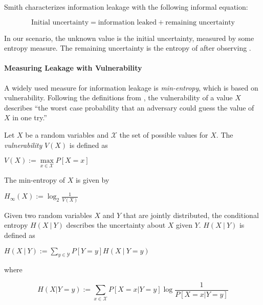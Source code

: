 Smith \cite{smith09} characterizes information leakage with the following informal equation:
\begin{center}
    \begin{equation}
        \text{Initial uncertainty} = \text{information leaked} + \text{remaining uncertainty}
    \end{equation}\label{eq:measure}
\end{center}
In our scenario, the unknown value \In is the initial uncertainty, measured by some entropy measure. The remaining uncertainty is the entropy of \In after observing \Out.

\paragraph*{Measuring Leakage with Vulnerability}
A widely used measure for information leakage is \emph{min-entropy}, which is based on vulnerability. Following the definitions from \cite{smith09}, the vulnerability of a value $X$ describes \enquote{the worst case probability that an adversary could guess the value of $X$ in one try.}

\begin{definition}\label{def:vul}
    Let $X$ be a random variables and $\mathcal{X}$ the set of possible values for $X$. The \emph{vulnerability} $V(X)$ is defined as
    \begin{center}
        $V(X) := \max\limits_{x \in \mathcal{X}} P[X = x]$
    \end{center}
    The min-entropy of $X$ is given by
    \begin{center}
        $H_\infty (X) := \log_2 \frac{1}{V(X)}$
    \end{center}
\end{definition}

\begin{definition}
    Given two random variables $X$ and $Y$ that are jointly distributed, the conditional entropy $H(X \: | \: Y)$ describes the uncertainty about $X$ given $Y$. $H(X \: | \: Y)$ is defined as 
    \begin{center}
        $H(X \: | \: Y) := \sum\limits_{y \in \mathcal{Y}} P[Y = y] H(X \: | \: Y = y)$
    \end{center}
    where
    \begin{center}
        \begin{equation}\label{eq:dynEntropy}
        H(X | Y = y) := \sum\limits_{x \in \mathcal{X}} P[X = x | Y = y] \log \frac{1}{P[X = x | Y = y]}
    \end{equation}
    \end{center}
    
\end{definition}

